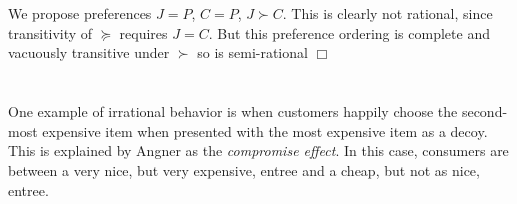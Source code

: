 \documentclass{article}
\begin{document}
\section{}
We propose preferences $J = P$, $C = P$, $J \succ C$. This is clearly not rational, since transitivity of $\succeq$ requires $J = C$. But this preference ordering is complete and vacuously transitive under $\succ$ so is semi-rational $\Box$

\section{}
One example of irrational behavior is when customers happily choose the second-most expensive item when presented with the most expensive item as a decoy. This is explained by Angner as the \textit{compromise effect}. In this case, consumers are  between a very nice, but very expensive, entree and a cheap, but not as nice, entree.
\end{document}
